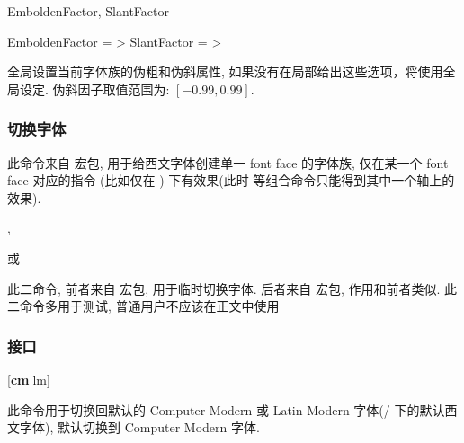 \begin{keyval}[added=2025-04-26, parent=xeCJK/options]{EmboldenFactor, SlantFactor}
  \begin{syntax}
    EmboldenFactor = >
    SlantFactor    = >
  \end{syntax}
  全局设置当前字体族的伪粗和伪斜属性, 如果没有在局部给出这些选项，将使用全局设定.
  伪斜因子取值范围为: $[-0.99, 0.99]$.
\end{keyval}


\subsubsection{切换字体}
\begin{function}[added=2025-04-26]{\newfontface}
  \begin{syntax}
  \end{syntax}
  此命令来自  宏包, 用于给西文字体创建单一 font face 的字体族, 仅在某一个 font face 对应的指令
  (比如仅在 ) 下有效果(此时  等组合命令只能得到其中一个轴上的效果).
\end{function}


\begin{function}[added=2025-04-26]{\fontspec, \CJKfontspec}
  \begin{syntax}
     或 
  \end{syntax}
  此二命令, 前者来自  宏包, 用于临时切换字体. 后者来自  宏包, 作用和前者类似. 
  此二命令多用于测试, 普通用户不应该在正文中使用
\end{function}


\clearpage
\subsubsection{\texorpdfstring{\ztex{}}{zTeX} 接口}
\begin{function}[added=2025-07-14]{\resetfont}
  \begin{syntax}
    [\textbf{cm}|lm]
  \end{syntax}
  此命令用于切换回默认的 Computer Modern 或 Latin Modern 字体(/ 下的默认西文字体), 
  默认切换到 Computer Modern 字体.
\end{function}


